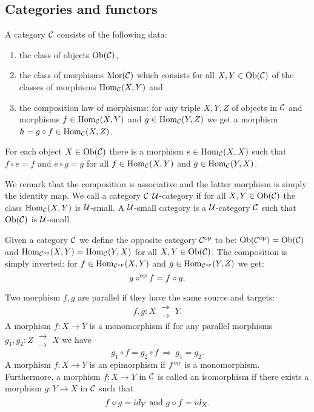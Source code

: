 \subsection{Categories and functors}
\begin{defi}
A category $\mathcal{C}$ consists of the following data:
\begin{enumerate}
\item the class of objects $\mathrm{Ob}(\mathcal{C})$,
\item the class of morphisms $\mathrm{Mor}(\mathcal{C})$ which consists for all $X, Y \in \mathrm{Ob}(\mathcal{C})$ of the classes of morphisms $\mathrm{Hom}_{\mathcal{C}}(X,Y)$ and 
\item the composition law of morphisms: for any triple $X, Y, Z$ of objects in $\mathcal{C}$ and morphisms $f \in \mathrm{Hom}_{\mathcal{C}}(X,Y)$ and $g \in \mathrm{Hom}_{\mathcal{C}}(Y,Z)$ we get a morphism $h = g \circ f \in \mathrm{Hom}_{\mathcal{C}}(X,Z)$.
\end{enumerate}
For each object $X \in \mathrm{Ob}(\mathcal{C})$ there is a morphism $e \in \mathrm{Hom}_{\mathcal{C}}(X,X)$ such that $f \circ e = f$ and $e \circ g = g$ for all $f \in \mathrm{Hom}_{\mathcal{C}}(X,Y)$ and $g \in \mathrm{Hom}_{\mathcal{C}}(Y,X)$.
\end{defi}
We remark that the composition is associative and the latter morphism is simply the identity map. We call a category $\mathcal{C}$ $\mathcal{U}$-category if for all $X, Y \in \mathrm{Ob}(\mathcal{C})$ the class $\mathrm{Hom}_{\mathcal{C}}(X,Y)$ is $\mathcal{U}$-small. A $\mathcal{U}$-small category is a $\mathcal{U}$-category $\mathcal{C}$ such that $\mathrm{Ob}(\mathcal{C})$ is $\mathcal{U}$-small.
\begin{defi}
Given a category $\mathcal{C}$ we define the opposite category $\mathcal{C}^{\mathrm{op}}$ to be:
$\mathrm{Ob}(\mathcal{C}^{\mathrm{op}}) = \mathrm{Ob}(\mathcal{C})$ and $\mathrm{Hom}_{\mathcal{C}^{\mathrm{op}}}(X,Y) = \mathrm{Hom}_{\mathcal{C}}(Y,X)$ for all $X, Y \in \mathrm{Ob}(\mathcal{C})$.
The composition is simply inverted: for $f \in \mathrm{Hom}_{\mathcal{C}^{\mathrm{op}}}(X,Y)$ and $g \in \mathrm{Hom}_{\mathcal{C}^{\mathrm{op}}}(Y,Z)$ we get:
$$g \circ^{\mathrm{op}} f = f \circ g.$$
\end{defi}
Two morphism $f, g$ are parallel if they have the same source and targets:
$$f, g : X\  \substack{\longrightarrow\\\longrightarrow}\ Y.$$
A morphism $f : X \longrightarrow Y$ is a monomorphism if for any parallel morphisms $g_1 , g_2 : Z\  \substack{\longrightarrow\\\longrightarrow}\ X$ we have
$$g_1 \circ f = g_2 \circ f\ \Rightarrow\ g_1 = g_2.$$
A morphism $f : X \longrightarrow Y$ is an epimorphism if $f^{\mathrm{op}}$ is a monomorphism. Furthermore, a morphism $f : X \longrightarrow Y$ in $\mathcal{C}$ is called an isomorphism if there exists a morphism $g : Y \longrightarrow X$ in $\mathcal{C}$ such that
$$ f \circ g = id_Y  \ \mathrm{and}\ g \circ f = id_X.$$
